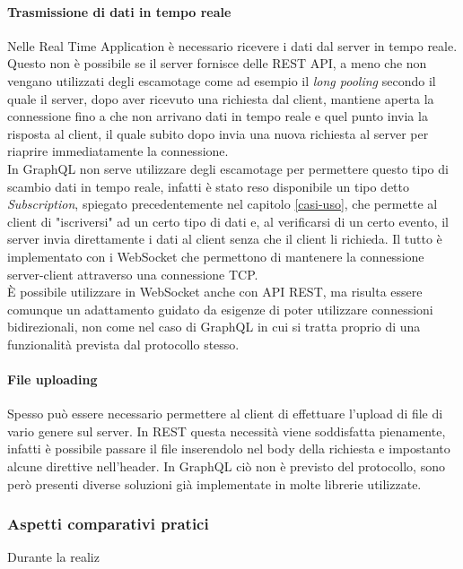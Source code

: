 \paragraph{Trasmissione di dati in tempo reale}
Nelle Real Time Application è necessario ricevere i dati dal server in tempo reale. Questo non è possibile se il server fornisce delle REST API, a meno che non vengano utilizzati degli escamotage come ad esempio il \textit{long pooling} secondo il quale il server, dopo aver ricevuto una richiesta dal client, mantiene aperta la connessione fino a che non arrivano dati in tempo reale e quel punto invia la risposta al client, il quale subito dopo invia una nuova richiesta al server per riaprire immediatamente la connessione.\\
In GraphQL non serve utilizzare degli escamotage per permettere questo tipo di scambio dati in tempo reale, infatti è stato reso disponibile un tipo detto \textit{Subscription}, spiegato precedentemente nel capitolo \ref{casi-uso}, che permette al client di "iscriversi" ad un certo tipo di dati e, al verificarsi di un certo evento, il server invia direttamente i dati al client senza che il client li richieda. Il tutto è implementato con i WebSocket che permettono di mantenere la connessione server-client attraverso una connessione TCP. \\
È possibile utilizzare in WebSocket anche con API REST, ma risulta essere comunque un adattamento guidato da esigenze di poter utilizzare connessioni bidirezionali, non come nel caso di GraphQL in cui si tratta proprio di una funzionalità prevista dal protocollo stesso.
\paragraph{File uploading}
Spesso può essere necessario permettere al client di effettuare l'upload di file di vario genere sul server. In REST questa necessità viene soddisfatta pienamente, infatti è possibile passare il file inserendolo nel body della richiesta e impostanto alcune direttive nell'header. In GraphQL ciò non è previsto del protocollo, sono però presenti diverse soluzioni già implementate in molte librerie utilizzate.
\subsubsection{Aspetti comparativi pratici}
Durante la realiz








